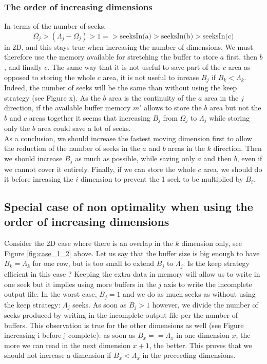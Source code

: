 \documentclass[conference]{IEEEtran}
\begin{document}
\subsubsection{The order of increasing dimensions}
In terms of the number of seeks, $$\Omega_j > (\Lambda_j-\Omega_j) > 1 => \textrm{seeksIn(a)} > \textrm{seeksIn(b)} > \textrm{seeksIn(c)}$$ in 2D, and this stays true when increasing the number of dimensions.
We must therefore use the memory available for stretching the buffer to store $a$ first, then $b$, and finally $c$.
The same way that it is not useful to save part of the $c$ area as opposed to storing the whole $c$ area, it is not useful to inrease $B_j$ if $B_k < \Lambda_k$.
Indeed, the number of seeks will be the same than without using the keep strategy (see Figure x).
As the $b$ area is the continuity of the $a$ area in the $j$ direction, if the available buffer memory $m'$ allows to store the $b$ area but not the $b$ and $c$ areas together it seems that increasing $B_j$ from $\Omega_j$ to $\Lambda_j$ while storing only the $b$ area could save a lot of seeks. \\

As a conclusion, we should increase the fastest moving dimension first to allow the reduction of the number of seeks in the $a$ and $b$ areas in the $k$ direction.
Then we should increase $B_j$ as much as possible, while saving only $a$ and then $b$, even if we cannot cover it entirely.
Finally, if we can store the whole $c$ area, we should do it before inreasing the $i$ dimension to prevent the 1 seek to be multiplied by $B_i$. \\

\subsection{Special case of non optimality when using the order of increasing dimensions}

Consider the 2D case where there is an overlap in the $k$ dimension only, see Figure \ref{fig:case_1_2} above.
Let us say that the buffer size is big enough to have $B_k = \Lambda_k$ for one row, but is too small to extend $B_j$ to $\Lambda_j$.
Is the keep strategy efficient in this case ?
Keeping the extra data in memory will allow us to write in one seek but it implies using more buffers in the $j$ axis to write the incomplete output file.
In the worst case, $B_j = 1$ and we do as much seeks as without using the keep strategy: $\Lambda_j$ seeks.
As soon as $B_j > 1$ however, we divide the number of seeks produced by writing in the incomplete output file per the number of buffers.
This observation is true for the other dimensions as well (see Figure increasing i before j complete): as soon as $B_x == \Lambda_x$ in one dimension $x$, the more we can read in the next dimension $x+1$, the better.
This proves that we should not increase a dimension if $B_x < \Lambda_x$ in the preceeding dimensions.
\end{document}
